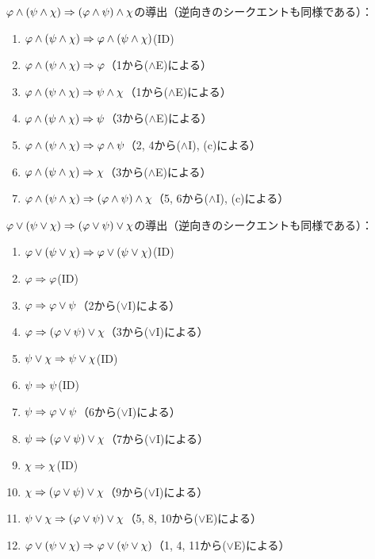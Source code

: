 \(\varphi \land \paren{\psi \land \chi} \sequent \paren{\varphi \land \psi} \land \chi\)の導出（逆向きのシークエントも同様である）：
\begin{enumerate}
	\item \(\varphi \land \paren{\psi \land \chi} \sequent \varphi \land \paren{\psi \land \chi}\)\quad (ID)
	\item \(\varphi \land \paren{\psi \land \chi} \sequent \varphi\)\quad （1から(\(\land\)E)による）
	\item \(\varphi \land \paren{\psi \land \chi} \sequent \psi \land \chi\)\quad （1から(\(\land\)E)による）
	\item \(\varphi \land \paren{\psi \land \chi} \sequent \psi\)\quad （3から(\(\land\)E)による）
	\item \(\varphi \land \paren{\psi \land \chi} \sequent \varphi \land \psi\)\quad （2, 4から(\(\land\)I), (c)による）
	\item \(\varphi \land \paren{\psi \land \chi} \sequent \chi\)\quad （3から(\(\land\)E)による）
	\item \(\varphi \land \paren{\psi \land \chi} \sequent \paren{\varphi \land \psi} \land \chi\)\quad （5, 6から(\(\land\)I), (c)による）
\end{enumerate}

\(\varphi \lor \paren{\psi \lor \chi} \sequent \paren{\varphi \lor \psi} \lor \chi\)の導出（逆向きのシークエントも同様である）：
\begin{enumerate}
	\item \(\varphi \lor \paren{\psi \lor \chi} \sequent \varphi \lor \paren{\psi \lor \chi}\)\quad (ID)
	\item \(\varphi \Rightarrow \varphi\)\quad (ID)
	\item \(\varphi \Rightarrow \varphi \lor \psi\)\quad （2から(\(\lor\)I)による）
	\item \(\varphi \sequent \paren{\varphi \lor \psi} \lor \chi\)\quad （3から(\(\lor\)I)による）
	\item \(\psi \lor \chi \Rightarrow \psi \lor \chi\)\quad (ID)
	\item \(\psi \Rightarrow \psi\)\quad (ID)
	\item \(\psi \Rightarrow \varphi \lor \psi\)\quad （6から(\(\lor\)I)による）
	\item \(\psi \sequent \paren{\varphi \lor \psi} \lor \chi\)\quad （7から(\(\lor\)I)による）
	\item \(\chi \Rightarrow \chi\)\quad (ID)
	\item \(\chi \sequent \paren{\varphi \lor \psi} \lor \chi\)\quad （9から(\(\lor\)I)による）
	\item \(\psi \lor \chi \sequent \paren{\varphi \lor \psi} \lor \chi\)\quad （5, 8, 10から(\(\lor\)E)による）
	\item \(\varphi \lor \paren{\psi \lor \chi} \sequent \varphi \lor \paren{\psi \lor \chi}\)\quad （1, 4, 11から(\(\lor\)E)による）
\end{enumerate}

